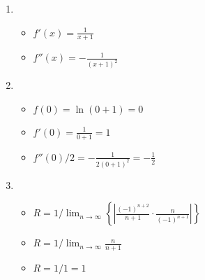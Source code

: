 \item
\begin{enumerate}

\item
\begin{itemize}
\item $f'(x) = \frac{1}{x+1}$
\item $f''(x) = -\frac{1}{(x+1)^2}$
\end{itemize}

\item
\begin{itemize}
\item $f(0)=\ln(0+1)=0$
\item $f'(0)=\frac{1}{0+1}=1$
\item $f''(0)/2=-\frac{1}{2(0+1)^2} = -\frac{1}{2}$
\end{itemize}

\item
\begin{itemize}
\item $R = 1/\lim_{n \to \infty} \left\{|\frac{(-1)^{n+2}}{n+1} \cdot \frac{n}{(-1)^{n+1}}|\right\}$
\item $R = 1/\lim_{n \to \infty} \frac{n}{n+1}$
\item $R = 1/1 = 1$
\end{itemize}

\end{enumerate}
